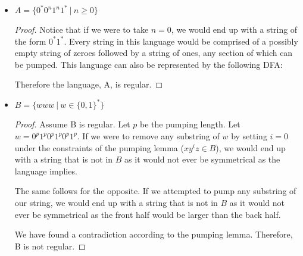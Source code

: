 \documentclass{article}
\begin{document}
\begin{itemize}
	\item $A= \{ 0^*0^n1^n1^* \ | \ n \geq 0\}$
	
    \begin{proof}
        Notice that if we were to take $n=0$, we would end up with a string of the form $0^*1^*$. Every string in this language would be comprised of a possibly empty string of zeroes followed by a string of ones, any section of which can be pumped. This language can also be represented by the following DFA:


\begin{center}
    \end{center}

    Therefore the language, A, is regular.
    \end{proof}
	\item $B= \{ www \ | \ w \in \{0,1\}^* \}$
	\begin{proof}
        Assume B is regular. Let $p$ be the pumping length. Let $w = 0^p1^p0^p1^p0^p1^p$. If we were to remove any substring of $w$ by setting $i=0$ under the constraints of the pumping lemma ($xy^iz \in B$), we would end up with a string that is not in $B$ as it would not ever be symmetrical as the language implies.
        
        The same follows for the opposite. If we attempted to pump any substring of our string, we would end up with a string that is not in $B$ as it would not ever be symmetrical as the front half would be larger than the back half.
        
        We have found a contradiction according to the pumping lemma. Therefore, B is not regular.
    \end{proof}
\end{itemize}
\end{document}
